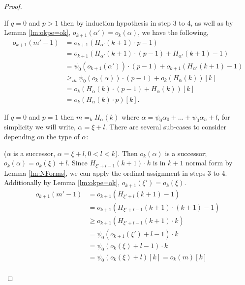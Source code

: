 \documentclass{amsart}
\theoremstyle{plain}
\theoremstyle{plain}
\newcommand{\okpe}{o_{k+1}}
\newcommand{\ok}{o_{k}}
\newcommand{\al}{{\alpha}}
\begin{document}
\begin{proof}
\begin{Cases}
\item If $q=0$ and $p>1$ then by induction hypothesis in step 3 to 4, as well as by Lemma \ref{lm:okpe=ok}, $\okpe(\al')=\ok(\al)$, we have the following,
    \begin{align*} 
            \okpe(m'-1)& =\okpe(H_{\al'}(k+1) \cdot p - 1)\\
            &= \okpe(H_{\al'}(k+1) \cdot (p-1) + H_{\al'}(k+1)-1)\\
            & =\psi_0(\okpe(\al')) \cdot (p-1) + \okpe(H_{\al'}(k+1)-1)\\
            &\geq_{ih}  \psi_0(\ok(\al))\cdot (p-1)  + \ok(H_\al (k))[k]\\
            &= \ok(H_\al(k)\cdot (p-1) + H_\al (k))[k] \\
            &=\ok(H_\al(k)\cdot p)[k].
        \end{align*}      
\item If $q=0$ and $p=1$ then $m=_k H_\al(k)$ where $\al = \psi_0\al_0 +... +\psi_0\al_n+l$, for simplicity we will write, $\al = \xi + l$.
There are several sub-cases to consider depending on the type of $\al$:
\begin{Cases}
        
        \item ($\al$ is a successor, $\al = \xi + l, 0<l<k$). Then $\ok(\al)$ is a successor; $\ok(\al)= \ok(\xi)+l $. Since $H_{\xi'+l-1}(k+1) \cdot k $ is in $k+1$ normal form by Lemma \ref{lm:NForms}, we can apply the ordinal assignment in steps 3 to 4.\\ Additionally by Lemma \ref{lm:okpe=ok}, $\okpe(\xi')=\ok(\xi)$.
        \begin{align*} 
            \okpe(m'-1)& =\okpe(H_{\xi'+l} (k+1) -1)\\
            & = \okpe(H_{\xi'+l-1} (k+1) \cdot (k+1) -1)\\
            & \geq \okpe(H_{\xi'+l-1}  (k+1)\cdot k )\\
            & = \psi_0({\okpe(\xi') +l-1}) \cdot k \\
            &= \psi_0({\ok(\xi)} + l-1) \cdot k\\
            &= \psi_0(\ok(\xi)+ l)[k] =\ok(m)[k]\\
        \end{align*}
        

\end{Cases}
\end{Cases}
\end{proof}
\end{document}
